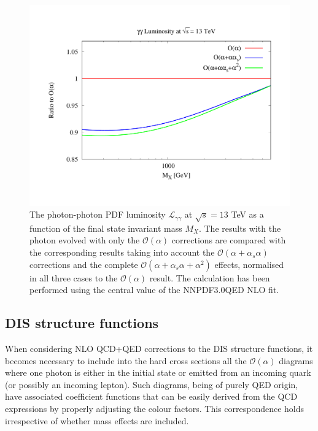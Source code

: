 \begin{figure}[ht]
\centering
\includegraphics[width=\columnwidth]{figs/lumi_13tev.pdf} 
\caption{The photon-photon PDF luminosity $\mathcal{L}_{\gamma\gamma}$ at $\sqrt{s} = 13$ TeV as a
  function of the final state invariant mass $M_X$.
  The results with the photon evolved
  with only the $\mathcal{O}(\alpha)$ corrections
  are compared with the corresponding results taking into account the 
  $\mathcal{O}(\alpha+\alpha_s\alpha)$ corrections
  and the complete
  $\mathcal{O}(\alpha+\alpha_s\alpha+\alpha^2)$ effects,
  normalised in all three cases to the $\mathcal{O}(\alpha)$ result.
  The calculation has been performed using the central value of the NNPDF3.0QED NLO
  fit.  }
\label{fig:GammaGammaLumi}
\end{figure}

\subsection{DIS structure functions}

When considering NLO QCD+QED corrections to the DIS structure
functions, it becomes necessary to include into the hard cross
sections all the $\mathcal{O}(\alpha)$ diagrams where one photon is
either in the initial state or emitted from an incoming quark (or
possibly an incoming lepton). Such diagrams, being of purely QED
origin, have associated coefficient functions that can be easily
derived from the QCD expressions by properly adjusting the colour
factors. This correspondence holds irrespective of whether mass
effects are included.

